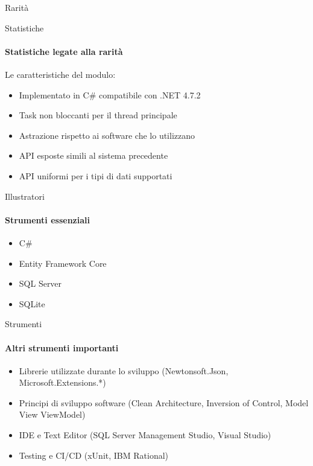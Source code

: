 \documentclass{beamer}
\begin{document}
\begin{darkframes}
\begin{frame}{Rarità}
  \end{frame}

  \begin{frame}{Statistiche}
    \framesubtitle{Statistiche legate alla rarità}

    Le caratteristiche del modulo:
    \begin{itemize}
      \item Implementato in C\# compatibile con .NET 4.7.2
      \item Task non bloccanti per il thread principale
      \item Astrazione rispetto ai software che lo utilizzano
      \item API esposte simili al sistema precedente
      \item API uniformi per i tipi di dati supportati
    \end{itemize}
  \end{frame}

  \begin{frame}{Illustratori}
    \framesubtitle{Strumenti essenziali}
    \begin{itemize}
      \item C\#
      \item Entity Framework Core
      \item SQL Server
      \item SQLite
    \end{itemize}
  \end{frame}

  \begin{frame}{Strumenti}
    \framesubtitle{Altri strumenti importanti}
    \begin{itemize}
      \item Librerie utilizzate durante lo sviluppo (Newtonsoft.Json, Microsoft.Extensions.*)
      \item Principi di sviluppo software (Clean Architecture, Inversion of Control, Model View ViewModel)
      \item IDE e Text Editor (SQL Server Management Studio, Visual Studio)
      \item Testing e CI/CD (xUnit, IBM Rational)
    \end{itemize}
  \end{frame}


\end{darkframes}
\end{document}
